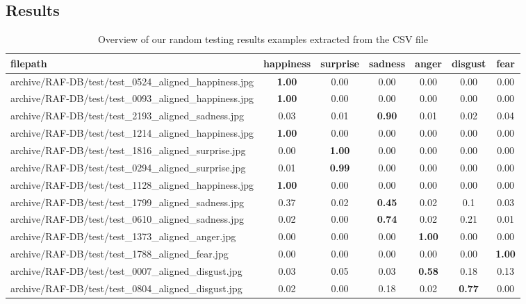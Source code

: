 \subsection{Results}
\label{sec:evaluation:results}

\begin{table}[ht]
  \centering
  \begin{tabular}{@{}lcccccc@{}}
  \toprule
  filepath & happiness & surprise & sadness & anger & disgust & fear \\
  \midrule
  archive/RAF-DB/test/test\_0524\_aligned\_happiness.jpg & \textbf{1.00} & 0.00 & 0.00 & 0.00 & 0.00 & 0.00 \\
  archive/RAF-DB/test/test\_0093\_aligned\_happiness.jpg & \textbf{1.00} & 0.00 & 0.00 & 0.00 & 0.00 & 0.00 \\
  archive/RAF-DB/test/test\_2193\_aligned\_sadness.jpg & 0.03 & 0.01 & \textbf{0.90} & 0.01 & 0.02 & 0.04 \\
  archive/RAF-DB/test/test\_1214\_aligned\_happiness.jpg & \textbf{1.00} & 0.00 & 0.00 & 0.00 & 0.00 & 0.00 \\
  archive/RAF-DB/test/test\_1816\_aligned\_surprise.jpg & 0.00 & \textbf{1.00} & 0.00 & 0.00 & 0.00 & 0.00 \\
  archive/RAF-DB/test/test\_0294\_aligned\_surprise.jpg & 0.01 & \textbf{0.99} & 0.00 & 0.00 & 0.00 & 0.00 \\
  archive/RAF-DB/test/test\_1128\_aligned\_happiness.jpg & \textbf{1.00} & 0.00 & 0.00 & 0.00 & 0.00 & 0.00 \\
  archive/RAF-DB/test/test\_1799\_aligned\_sadness.jpg & 0.37 & 0.02 & \textbf{0.45} & 0.02 & 0.1 & 0.03 \\
  archive/RAF-DB/test/test\_0610\_aligned\_sadness.jpg & 0.02 & 0.00 & \textbf{0.74} & 0.02 & 0.21 & 0.01 \\
  archive/RAF-DB/test/test\_1373\_aligned\_anger.jpg & 0.00 & 0.00 & 0.00 & \textbf{1.00} & 0.00 & 0.00 \\
  archive/RAF-DB/test/test\_1788\_aligned\_fear.jpg & 0.00 & 0.00 & 0.00 & 0.00 & 0.00 & \textbf{1.00} \\
  archive/RAF-DB/test/test\_0007\_aligned\_disgust.jpg & 0.03 & 0.05 & 0.03 & \textbf{0.58} & 0.18 & 0.13 \\
  archive/RAF-DB/test/test\_0804\_aligned\_disgust.jpg & 0.02 & 0.00 & 0.18 & 0.02 & \textbf{0.77} & 0.00 \\
  \bottomrule
  \end{tabular}
  \caption{Overview of our random testing results examples extracted from the CSV file}
  \label{tab:testcsv}
\end{table}  

